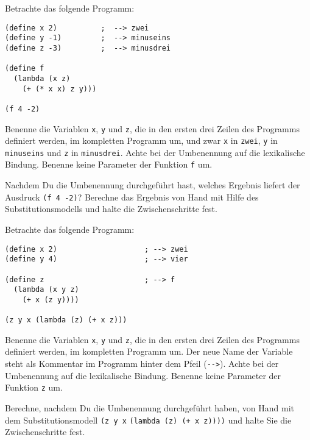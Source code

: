 \begin{aufgabe}

  Betrachte das folgende Programm:

\begin{verbatim}
(define x 2)          ;  --> zwei
(define y -1)         ;  --> minuseins
(define z -3)         ;  --> minusdrei

(define f 
  (lambda (x z)
    (+ (* x x) z y)))

(f 4 -2)
\end{verbatim}
  Benenne die Variablen \verb"x", \verb"y" und \verb"z", die in
  den ersten drei Zeilen des Programms definiert werden, im kompletten
  Programm um, und zwar \verb|x| in \verb|zwei|, \verb|y| in
  \verb|minuseins| und \verb|z| in \verb|minusdrei|. Achte bei
  der Umbenennung auf die lexikalische Bindung.  Benenne keine
  Parameter der Funktion \verb"f" um.

  Nachdem Du die Umbenennung durchgeführt hast, welches Ergebnis liefert
  der Ausdruck \verb"(f 4 -2)"? Berechne das Ergebnis von Hand mit Hilfe
  des Substitutionsmodells und halte die Zwischenschritte fest.
\end{aufgabe}

\begin{aufgabe}

  Betrachte das folgende Programm:

\begin{verbatim}
(define x 2)                    ; --> zwei
(define y 4)                    ; --> vier

(define z                       ; --> f
  (lambda (x y z)
    (+ x (z y))))

(z y x (lambda (z) (+ x z)))
\end{verbatim}
%
  Benenne die Variablen \verb"x", \verb"y" und \verb"z", die in
  den ersten drei Zeilen des Programms definiert werden, im kompletten
  Programm um. Der neue Name der Variable steht als Kommentar im
  Programm hinter dem Pfeil (\verb"-->").  Achte bei der
  Umbenennung auf die lexikalische Bindung.  Benenne keine
  Parameter der Funktion \verb"z" um.

  Berechne, nachdem Du die Umbenennung durchgeführt haben, von
  Hand mit dem Substitutionsmodell \verb"(z y x"
  \verb"(lambda (z) (+ x z))))" und halte Sie die Zwischenschritte
  fest.

\end{aufgabe}


